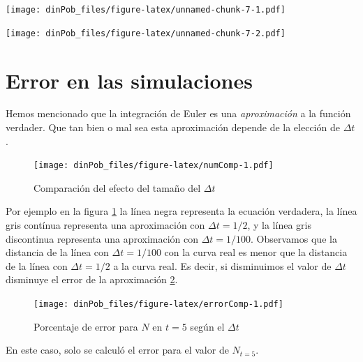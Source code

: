 \documentclass[12pt,letterpaper,]{book}
\newenvironment{Shaded}{\begin{snugshade}}{\end{snugshade}}
\newcommand{\KeywordTok}[1]{\textcolor[rgb]{0.13,0.29,0.53}{\textbf{#1}}}
\newcommand{\DataTypeTok}[1]{\textcolor[rgb]{0.13,0.29,0.53}{#1}}
\newcommand{\StringTok}[1]{\textcolor[rgb]{0.31,0.60,0.02}{#1}}
\newcommand{\OperatorTok}[1]{\textcolor[rgb]{0.81,0.36,0.00}{\textbf{#1}}}
\newcommand{\NormalTok}[1]{#1}
\begin{document}
\texttt{[image: dinPob\_files/figure-latex/unnamed-chunk-7-1.pdf]}

\begin{Shaded}
\end{Shaded}

\texttt{[image: dinPob\_files/figure-latex/unnamed-chunk-7-2.pdf]}

\section{Error en las simulaciones}\label{error-en-las-simulaciones}

Hemos mencionado que la integración de Euler es una \emph{aproximación}
a la función verdader. Que tan bien o mal sea esta aproximación depende
de la elección de \(\Delta t\).

\begin{figure}
\centering
\texttt{[image: dinPob\_files/figure-latex/numComp-1.pdf]}
\caption{\label{fig:numComp}Comparación del efecto del tamaño del
\(\Delta t\)}
\end{figure}

Por ejemplo en la figura \ref{fig:numComp} la línea negra representa la
ecuación verdadera, la línea gris contínua representa una aproximación
con \(\Delta t = 1/2\), y la línea gris discontinua representa una
aproximación con \(\Delta t = 1/100\). Observamos que la distancia de la
línea con \(\Delta t = 1/100\) con la curva real es menor que la
distancia de la línea con \(\Delta t = 1/2\) a la curva real. Es decir,
si disminuimos el valor de \(\Delta t\) disminuye el error de la
aproximación \ref{fig:errorComp}.

\begin{figure}
\centering
\texttt{[image: dinPob\_files/figure-latex/errorComp-1.pdf]}
\caption{\label{fig:errorComp}Porcentaje de error para \(N\) en \(t=5\)
según el \(\Delta t\)}
\end{figure}

En este caso, solo se calculó el error para el valor de \(N_{t=5}\).
\end{document}
